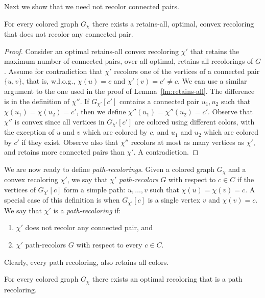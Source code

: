 Next we show that we need not recolor connected pairs.

\begin{lemma}
\label{lm:does_not_recolor_connected_pair}
For every colored graph $G_\chi$ there exists a retains-all,
optimal,
convex recoloring that does not recolor any connected pair.
\end{lemma}

\begin{proof}
Consider an optimal retains-all convex recoloring $\chi'$ 
that retains the maximum number of connected pairs, 
over all optimal, 
retains-all recolorings of $G$.  
%
Assume for contradiction that $\chi'$ 
recolors one of the vertices of a connected pair $\{u, v\}$, 
that is, 
w.l.o.g., 
$\chi(u) = c$ and $\chi'(v) = c' \neq c$.
%
We can use a similar argument to the one used in the proof of Lemma~\ref{lm:retains-all}.
%
The difference is in the definition of $\chi''$.  
%
If $G_{\chi'}[c']$ contains a connected pair $u_1, u_2$ 
such that $\chi(u_1) = \chi(u_2) = c'$, 
then we define $\chi''(u_1) = \chi''(u_2) = c'$.
%
Observe that $\chi''$ is convex since all vertices in $G_{\chi'}[c']$
are colored using different colors,
with the exception of $u$ and $v$ which are colored by $c$,
and $u_1$ and $u_2$ which are colored by $c'$ if they exist. 
%
Observe also that $\chi''$ recolors at most as many vertices as $\chi'$, 
and retains more connected pairs than $\chi'$. 
%
A contradiction.
\end{proof}

We are now ready to define \emph{path-recolorings}.
%
Given a colored graph $G_\chi$ and a convex recoloring $\chi'$, 
we say that $\chi'$ \emph{path-recolors} $G$ with respect to $c \in C$ 
if the vertices of $G_{\chi'}[c]$ form a simple path: 
$u, \dots, v$ such that $\chi(u) = \chi(v) = c$.
%
A special case of this definition is when  $G_{\chi'}[c]$ 
is a single vertex $v$ and $\chi(v) = c$.
%
We say that $\chi'$ is a \emph{path-recoloring} if:
\begin{enumerate}
	\item $\chi'$ does not recolor any connected pair, and 
	\item $\chi'$ path-recolors $G$ with respect to every $c \in C$.
\end{enumerate}
Clearly, every path recoloring, also retains all colors.

\begin{lemma}
\label{lm:optimal_path_recoloring}
For every colored graph $G_\chi$ 
there exists an optimal recoloring that is a path recoloring.
\end{lemma}

